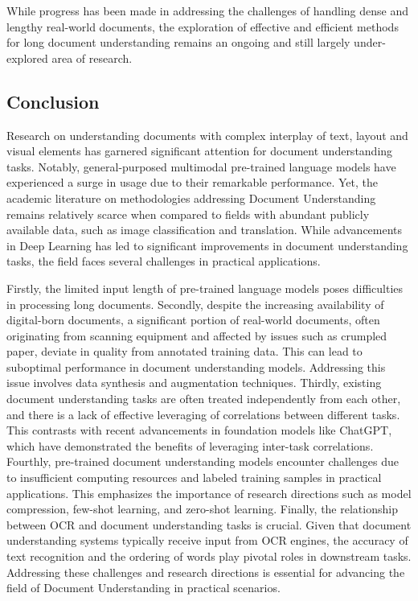 While progress has been made in addressing the challenges of handling dense and lengthy real-world documents, the exploration of effective and efficient methods for long document understanding remains an ongoing and still largely under-explored area of research. 


\subsection{Conclusion}

Research on understanding documents with complex interplay of text, layout and visual elements has garnered significant attention for document understanding tasks. Notably, general-purposed multimodal pre-trained language models have  experienced a surge in usage due to their remarkable performance. Yet, the academic literature on methodologies addressing Document Understanding remains relatively scarce when compared to fields with abundant publicly available data, such as image classification and translation. While advancements in Deep Learning has led to significant improvements in document understanding tasks, the field faces several challenges in practical applications. 

Firstly, the limited input length of pre-trained language models poses difficulties in processing long documents. Secondly, despite the increasing availability of digital-born documents, a significant portion of real-world documents, often originating from scanning equipment and affected by issues such as crumpled paper, deviate in quality from annotated training data. This can lead to suboptimal performance in document understanding models. Addressing this issue involves data synthesis and augmentation techniques. Thirdly, existing document understanding tasks are often treated independently from each other, and there is a lack of effective leveraging of correlations between different tasks. This contrasts with recent advancements in foundation models like ChatGPT, which have demonstrated the benefits of leveraging inter-task correlations. Fourthly, pre-trained document understanding models encounter challenges due to insufficient computing resources and labeled training samples in practical applications. This emphasizes the importance of research directions such as model compression, few-shot learning, and zero-shot learning. Finally, the relationship between \ac{OCR} and document understanding tasks is crucial. Given that document understanding systems typically receive input from \ac{OCR} engines, the accuracy of text recognition and the ordering of words play pivotal roles in downstream tasks. Addressing these challenges and research directions is essential for advancing the field of Document Understanding in practical scenarios.

